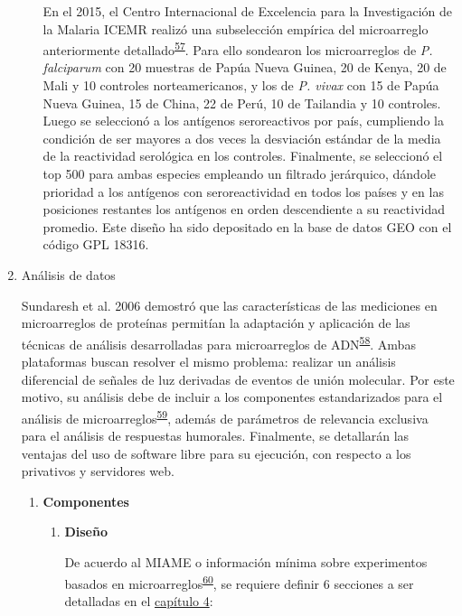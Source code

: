 \documentclass[]{article}
\begin{document}
\begin{enumerate}
\begin{enumerate}
    En el 2015, el Centro Internacional de Excelencia para la
    Investigación de la Malaria ICEMR realizó una subselección empírica
    del microarreglo anteriormente
    detallado\textsuperscript{\protect\hyperlink{ref-King2015FOC}{57}}.
    Para ello sondearon los microarreglos de \emph{P. falciparum} con 20
    muestras de Papúa Nueva Guinea, 20 de Kenya, 20 de Mali y 10
    controles norteamericanos, y los de \emph{P. vivax} con 15 de Papúa
    Nueva Guinea, 15 de China, 22 de Perú, 10 de Tailandia y 10
    controles. Luego se seleccionó a los antígenos seroreactivos por
    país, cumpliendo la condición de ser mayores a dos veces la
    desviación estándar de la media de la reactividad serológica en los
    controles. Finalmente, se seleccionó el top 500 para ambas especies
    empleando un filtrado jerárquico, dándole prioridad a los antígenos
    con seroreactividad en todos los países y en las posiciones
    restantes los antígenos en orden descendiente a su reactividad
    promedio. Este diseño ha sido depositado en la base de datos GEO con
    el código GPL 18316.
  \end{enumerate}
\item
  Análisis de datos

  Sundaresh et al. 2006 demostró que las características de las
  mediciones en microarreglos de proteínas permitían la adaptación y
  aplicación de las técnicas de análisis desarrolladas para
  microarreglos de
  ADN\textsuperscript{\protect\hyperlink{ref-sundaresh2006}{58}}. Ambas
  plataformas buscan resolver el mismo problema: realizar un análisis
  diferencial de señales de luz derivadas de eventos de unión molecular.
  Por este motivo, su análisis debe de incluir a los componentes
  estandarizados para el análisis de
  microarreglos\textsuperscript{\protect\hyperlink{ref-allison2006}{59}},
  además de parámetros de relevancia exclusiva para el análisis de
  respuestas humorales. Finalmente, se detallarán las ventajas del uso
  de software libre para su ejecución, con respecto a los privativos y
  servidores web.

  \begin{enumerate}
  \def\labelenumii{\roman{enumii}.}
  \item
    \textbf{Componentes}

    \begin{enumerate}
    \def\labelenumiii{\arabic{enumiii}.}
    \item
      \textbf{Diseño}

      De acuerdo al MIAME o información mínima sobre experimentos
      basados en
      microarreglos\textsuperscript{\protect\hyperlink{ref-brazma2001}{60}},
      se requiere definir 6 secciones a ser detalladas en el
      \protect\hyperlink{meto}{capítulo 4}:


\end{enumerate}
\end{enumerate}
\end{enumerate}
\end{document}
